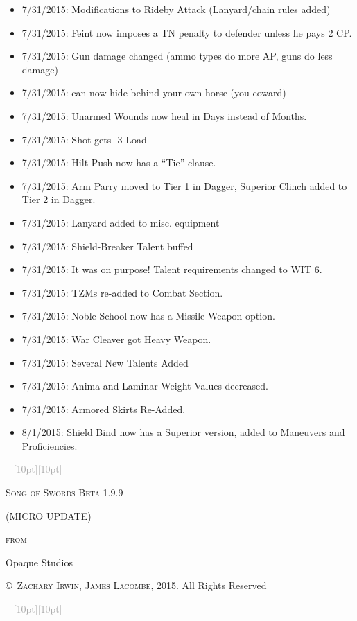 \documentclass[oneside,11pt,english]{book}
\newcommand{\ornamento}{\vspace{2em}\noindent \textcolor{darkgray}{\hrulefill~ \raisebox{-2.5pt}[10pt][10pt]{\leafright \decofourleft \decothreeleft  \aldineright \decotwo \floweroneleft \decoone   \floweroneright \decotwo \aldineleft\decothreeright \decofourright \leafleft} ~  \hrulefill \newline \vspace{2em}}}
\begin{document}
{\begin{itemize}
\item 7/31/2015: Modifications to Rideby Attack (Lanyard/chain rules added) 
\item 7/31/2015: Feint now imposes a TN penalty to defender unless he pays 2 CP. 
\item 7/31/2015: Gun damage changed (ammo types do more AP, guns do less damage) 
\item 7/31/2015: can now hide behind your own horse (you coward) 
\item 7/31/2015: Unarmed Wounds now heal in Days instead of Months. 
\item 7/31/2015: Shot gets -3 Load 
\item 7/31/2015: Hilt Push now has a “Tie” clause. 
\item 7/31/2015: Arm Parry moved to Tier 1 in Dagger, Superior Clinch added to Tier 2 in Dagger. 
\item 7/31/2015: Lanyard added to misc. equipment 
\item 7/31/2015: Shield-Breaker Talent buffed 
\item 7/31/2015: It was on purpose! Talent requirements changed to WIT 6. 
\item 7/31/2015: TZMs re-added to Combat Section. 
\item 7/31/2015: Noble School now has a Missile Weapon option. 
\item 7/31/2015: War Cleaver got Heavy Weapon. 
\item 7/31/2015: Several New Talents Added 
\item 7/31/2015: Anima and Laminar Weight Values decreased. 
\item 7/31/2015: Armored Skirts Re-Added. 
\item 8/1/2015: Shield Bind now has a Superior version, added to Maneuvers and Proficiencies. 
\end{itemize}}
\begin{titlepage}
\pagestyle{empty}
	\centering
	\ornamento\\
	{\scshape\Huge Song of Swords Beta 1.9.9\par}
	\vspace{0.8cm}
	{\scshape\Large{(MICRO UPDATE)}\par \scshape\Large{from} \par}
	\vspace{0.1 cm}
	{\huge Opaque Studios \par}
	\vfill
	\vspace{0.2 cm}
	 \textsc{\copyright~Zachary Irwin, James Lacombe}, 2015. All Rights Reserved
	 
	 
	 \ornamento
\end{titlepage}
\end{document}
